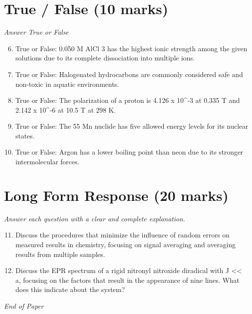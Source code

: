 \documentclass[12pt]{article}
\begin{document}
\section*{True / False (10 marks)}
\textit{Answer True or False}
\begin{enumerate}[label=\arabic*.]
\setcounter{enumi}{5}
\item True or False: 0.050 M AlCl 3 has the highest ionic strength among the given solutions due to its complete dissociation into multiple ions.
\item True or False: Halogenated hydrocarbons are commonly considered safe and non-toxic in aquatic environments.
\item True or False: The polarization of a proton is 4.126 x 10^-3 at 0.335 T and 2.142 x 10^-6 at 10.5 T at 298 K.
\item True or False: The 55 Mn nuclide has five allowed energy levels for its nuclear states.
\item True or False: Argon has a lower boiling point than neon due to its stronger intermolecular forces.
\end{enumerate}

\section*{Long Form Response (20 marks)}
\textit{Answer each question with a clear and complete explanation.}
\begin{enumerate}[label=\arabic*.]
\setcounter{enumi}{10}
\item Discuss the procedures that minimize the influence of random errors on measured results in chemistry, focusing on signal averaging and averaging results from multiple samples.
\item Discuss the EPR spectrum of a rigid nitronyl nitroxide diradical with J \textless{}\textless{} a, focusing on the factors that result in the appearance of nine lines. What does this indicate about the system?
\end{enumerate}

\vfill
\noindent\textit{End of Paper}
\end{document}
